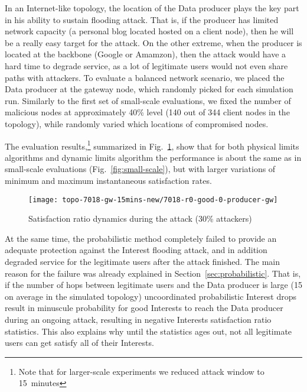 In an Internet-like topology, the location of the Data producer plays the key part in his ability to sustain flooding attack.
That is, if the producer has limited network capacity (a personal blog located hosted on a client node), then he will be a really easy target for the attack.
On the other extreme, when the producer is located at the backbone (Google or Amamzon), then the attack would have a hard time to degrade service, as a lot of legitimate users would not even share paths with attackers.
To evaluate a balanced network scenario, we placed the Data producer at the gateway node, which randomly picked for each simulation run.
Similarly to the first set of small-scale evaluations, we fixed the number of malicious nodes at approximately 40\% level (140 out of 344 client nodes in the topology), while randomly varied which locations of compromised nodes.


The evaluation results,\footnote{Note that for larger-scale experiments we reduced attack window to 15~minutes} summarized in Fig.~\ref{fig:large-scale}, show that for both physical limits algorithms and dynamic limits algorithm the performance is about the same as in small-scale evaluations (Fig.~\ref{fig:small-scale}), but with larger variations of minimum and maximum instantaneous satisfaction rates.

\begin{figure}[tbh]
 \centering
 \texttt{[image: topo-7018-gw-15mins-new/7018-r0-good-0-producer-gw]}
 \caption{Satisfaction ratio dynamics during the attack (30\% attackers)}
 \label{fig:large-scale}
\end{figure}

At the same time, the probabilistic method completely failed to provide an adequate protection against the Interest flooding attack, and in addition degraded service for the legitimate users after the attack finished.
The main reason for the failure was already explained in Section~\ref{sec:probabilistic}.
That is, if the number of hops between legitimate users and the Data producer is large (15 on average in the simulated topology) uncoordinated probabilistic Interest drops result in minuscule probability for good Interests to reach the Data producer during an ongoing attack, resulting in negative Interests satisfaction ratio statistics.
This also explains why until the statistics ages out, not all legitimate users can get satisfy all of their Interests.

